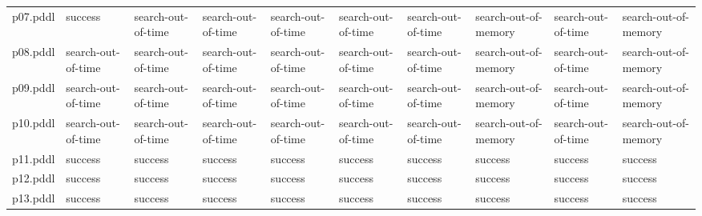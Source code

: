 \documentclass{article}
\begin{document}
\begin{tabular}{@{}lrrrrrrrrr@{}}
p07.pddl & \multicolumn{1}{|l|}{success} & \multicolumn{1}{|l|}{search-out-of-time} & \multicolumn{1}{|l|}{search-out-of-time} & \multicolumn{1}{|l|}{search-out-of-time} & \multicolumn{1}{|l|}{search-out-of-time} & \multicolumn{1}{|l|}{search-out-of-time} & \multicolumn{1}{|l|}{search-out-of-memory} & \multicolumn{1}{|l|}{search-out-of-time} & \multicolumn{1}{|l|}{search-out-of-memory} \\
p08.pddl & \multicolumn{1}{|l|}{search-out-of-time} & \multicolumn{1}{|l|}{search-out-of-time} & \multicolumn{1}{|l|}{search-out-of-time} & \multicolumn{1}{|l|}{search-out-of-time} & \multicolumn{1}{|l|}{search-out-of-time} & \multicolumn{1}{|l|}{search-out-of-time} & \multicolumn{1}{|l|}{search-out-of-memory} & \multicolumn{1}{|l|}{search-out-of-time} & \multicolumn{1}{|l|}{search-out-of-memory} \\
p09.pddl & \multicolumn{1}{|l|}{search-out-of-time} & \multicolumn{1}{|l|}{search-out-of-time} & \multicolumn{1}{|l|}{search-out-of-time} & \multicolumn{1}{|l|}{search-out-of-time} & \multicolumn{1}{|l|}{search-out-of-time} & \multicolumn{1}{|l|}{search-out-of-time} & \multicolumn{1}{|l|}{search-out-of-memory} & \multicolumn{1}{|l|}{search-out-of-time} & \multicolumn{1}{|l|}{search-out-of-memory} \\
p10.pddl & \multicolumn{1}{|l|}{search-out-of-time} & \multicolumn{1}{|l|}{search-out-of-time} & \multicolumn{1}{|l|}{search-out-of-time} & \multicolumn{1}{|l|}{search-out-of-time} & \multicolumn{1}{|l|}{search-out-of-time} & \multicolumn{1}{|l|}{search-out-of-time} & \multicolumn{1}{|l|}{search-out-of-memory} & \multicolumn{1}{|l|}{search-out-of-time} & \multicolumn{1}{|l|}{search-out-of-memory} \\
p11.pddl & \multicolumn{1}{|l|}{success} & \multicolumn{1}{|l|}{success} & \multicolumn{1}{|l|}{success} & \multicolumn{1}{|l|}{success} & \multicolumn{1}{|l|}{success} & \multicolumn{1}{|l|}{success} & \multicolumn{1}{|l|}{success} & \multicolumn{1}{|l|}{success} & \multicolumn{1}{|l|}{success} \\
p12.pddl & \multicolumn{1}{|l|}{success} & \multicolumn{1}{|l|}{success} & \multicolumn{1}{|l|}{success} & \multicolumn{1}{|l|}{success} & \multicolumn{1}{|l|}{success} & \multicolumn{1}{|l|}{success} & \multicolumn{1}{|l|}{success} & \multicolumn{1}{|l|}{success} & \multicolumn{1}{|l|}{success} \\
p13.pddl & \multicolumn{1}{|l|}{success} & \multicolumn{1}{|l|}{success} & \multicolumn{1}{|l|}{success} & \multicolumn{1}{|l|}{success} & \multicolumn{1}{|l|}{success} & \multicolumn{1}{|l|}{success} & \multicolumn{1}{|l|}{success} & \multicolumn{1}{|l|}{success} & \multicolumn{1}{|l|}{success} \\

\end{tabular}
\end{document}
